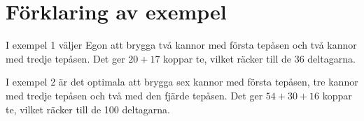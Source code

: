 \section*{Förklaring av exempel}
I exempel 1 väljer Egon att brygga två kannor med första tepåsen 
och två kannor med tredje tepåsen. Det ger $20+17$ koppar te, vilket
räcker till de 36 deltagarna.

I exempel 2 är det optimala att brygga sex kannor med första tepåsen,
tre kannor med tredje tepåsen och två med den fjärde tepåsen.
Det ger $54+30+16$ koppar te, vilket räcker till de 100  deltagarna.
